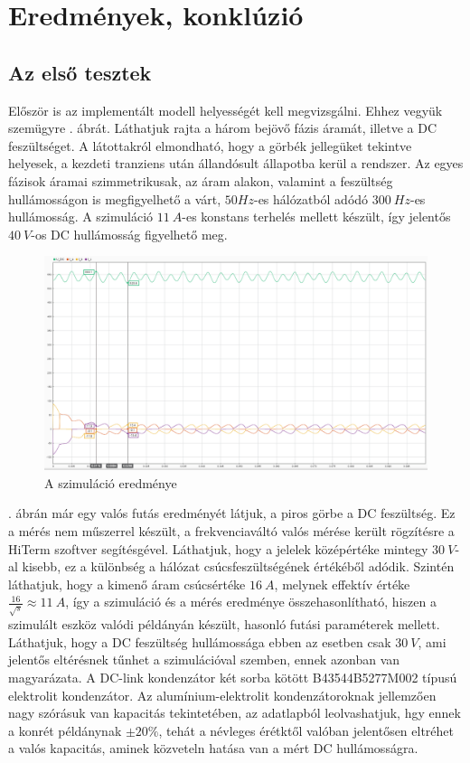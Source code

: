 \chapter{Eredmények, konklúzió}

\section{Az első tesztek}

Először is az implementált modell helyességét kell megvizsgálni. Ehhez vegyük szemügyre . ábrát. Láthatjuk rajta a három bejövő fázis áramát, illetve a DC feszültséget. A látottakról elmondható, hogy a görbék jellegüket tekintve helyesek, a kezdeti tranziens után állandósult állapotba kerül a rendszer. Az egyes fázisok áramai szimmetrikusak, az áram alakon, valamint a feszültség hullámosságon is megfigyelhető a várt, $50 Hz$-es hálózatból adódó $300\ Hz$-es hullámosság. A szimuláció $11\ A$-es konstans terhelés mellett készült, így jelentős $40\ V$-os DC hullámosság figyelhető meg.

\begin{figure}[H]
	\centering
	\includegraphics[width = \textwidth]{figures/continous_testrun_1.png}
	\caption{A szimuláció eredménye} 
	\label{fig:cont_run}
\end{figure}

. ábrán már egy valós futás eredményét látjuk, a piros görbe a DC feszültség. Ez a mérés nem műszerrel készült, a frekvenciaváltó valós mérése került rögzítésre a HiTerm szoftver segítésgével. Láthatjuk, hogy a jelelek középértéke mintegy $30\ V$-al kisebb, ez a különbség a hálózat csúcsfeszültségének értékéből adódik. Szintén láthatjuk, hogy a kimenő áram csúcsértéke $16\ A$, melynek effektív értéke $\frac{16}{\sqrt{s}} \approx 11\ A$, így a szimuláció és a mérés eredménye összehasonlítható, hiszen a szimulált eszköz valódi példányán készült, hasonló futási paraméterek mellett. Láthatjuk, hogy a DC feszültség hullámossága ebben az esetben csak $30\ V$, ami jelentős eltérésnek tűnhet a szimulációval szemben, ennek azonban van magyarázata. A DC-link kondenzátor két sorba kötött B43544B5277M002 típusú elektrolit kondenzátor. Az alumínium-elektrolit kondenzátoroknak jellemzően nagy szórásuk van kapacitás tekintetében, az adatlapból leolvashatjuk, hgy ennek a konrét példánynak $\pm 20\%$, tehát a névleges érétktől valóban jelentősen eltréhet a valós kapacitás, aminek közveteln hatása van a mért DC hullámosságra.


